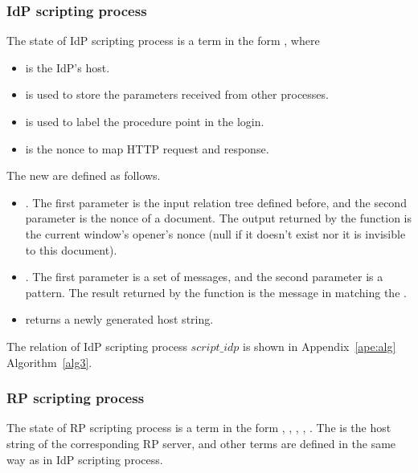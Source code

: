 \subsubsection{IdP scripting process}
The state of IdP scripting process  is a term in the form , where
\begin{itemize}
\setlength\itemsep{-2pt}
\item {} is the IdP's host.
\item {} is used to store the parameters received from other processes.
\item {} is used to label the procedure point in the login.
\item {} is the nonce to map HTTP request and response.
\end{itemize}
The new  are defined as follows.
\begin{itemize}
\setlength\itemsep{-2pt}
 \item {}. The first parameter is the input relation tree defined before, and the second parameter is the nonce of a document. The output returned by the function is the current window's opener's nonce (null if it doesn't exist nor it is invisible to this document).
  \item {}. The first parameter is a set of messages, and the second parameter is a pattern. The result returned by the function is the message in  matching the .
  \item {} returns a newly generated host string.
\end{itemize}
The relation of IdP scripting process $script\_idp$ is shown in Appendix~\ref{ape:alg} Algorithm~\ref{alg3}.




\subsubsection{RP scripting process}
The state of RP scripting process  is a term in the form , , , , . The  is the host string of the corresponding RP server, and other terms are defined in the same way as in IdP scripting process.

